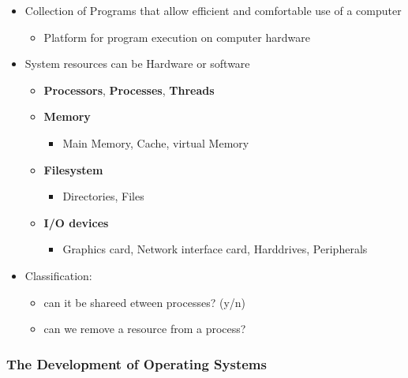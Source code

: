\begin{itemize}
\tightlist
\item
  Collection of Programs that allow efficient and comfortable use of a
  computer

  \begin{itemize}
  \tightlist
  \item
    Platform for program execution on computer hardware
  \end{itemize}
\item
  System resources can be Hardware or software

  \begin{itemize}
  \tightlist
  \item
    \textbf{Processors}, \textbf{Processes}, \textbf{Threads}
  \item
    \textbf{Memory}

    \begin{itemize}
    \tightlist
    \item
      Main Memory, Cache, virtual Memory
    \end{itemize}
  \item
    \textbf{Filesystem}

    \begin{itemize}
    \tightlist
    \item
      Directories, Files
    \end{itemize}
  \item
    \textbf{I/O devices}

    \begin{itemize}
    \tightlist
    \item
      Graphics card, Network interface card, Harddrives, Peripherals
    \end{itemize}
  \end{itemize}
\item
  Classification:

  \begin{itemize}
  \tightlist
  \item
    can it be shareed etween processes? (y/n)
  \item
    can we remove a resource from a process?
  \end{itemize}
\end{itemize}

\hypertarget{the-development-of-operating-systems}{%
\subsubsection{The Development of Operating
Systems}\label{the-development-of-operating-systems}}

